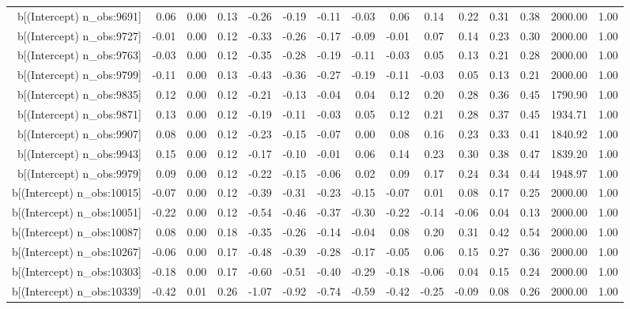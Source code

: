 \begin{table}[ht]
\begin{tabular}{rrrrrrrrrrrrrrr}
  b[(Intercept) n\_obs:9691] & 0.06 & 0.00 & 0.13 & -0.26 & -0.19 & -0.11 & -0.03 & 0.06 & 0.14 & 0.22 & 0.31 & 0.38 & 2000.00 & 1.00 \\ 
  b[(Intercept) n\_obs:9727] & -0.01 & 0.00 & 0.12 & -0.33 & -0.26 & -0.17 & -0.09 & -0.01 & 0.07 & 0.14 & 0.23 & 0.30 & 2000.00 & 1.00 \\ 
  b[(Intercept) n\_obs:9763] & -0.03 & 0.00 & 0.12 & -0.35 & -0.28 & -0.19 & -0.11 & -0.03 & 0.05 & 0.13 & 0.21 & 0.28 & 2000.00 & 1.00 \\ 
  b[(Intercept) n\_obs:9799] & -0.11 & 0.00 & 0.13 & -0.43 & -0.36 & -0.27 & -0.19 & -0.11 & -0.03 & 0.05 & 0.13 & 0.21 & 2000.00 & 1.00 \\ 
  b[(Intercept) n\_obs:9835] & 0.12 & 0.00 & 0.12 & -0.21 & -0.13 & -0.04 & 0.04 & 0.12 & 0.20 & 0.28 & 0.36 & 0.45 & 1790.90 & 1.00 \\ 
  b[(Intercept) n\_obs:9871] & 0.13 & 0.00 & 0.12 & -0.19 & -0.11 & -0.03 & 0.05 & 0.12 & 0.21 & 0.28 & 0.37 & 0.45 & 1934.71 & 1.00 \\ 
  b[(Intercept) n\_obs:9907] & 0.08 & 0.00 & 0.12 & -0.23 & -0.15 & -0.07 & 0.00 & 0.08 & 0.16 & 0.23 & 0.33 & 0.41 & 1840.92 & 1.00 \\ 
  b[(Intercept) n\_obs:9943] & 0.15 & 0.00 & 0.12 & -0.17 & -0.10 & -0.01 & 0.06 & 0.14 & 0.23 & 0.30 & 0.38 & 0.47 & 1839.20 & 1.00 \\ 
  b[(Intercept) n\_obs:9979] & 0.09 & 0.00 & 0.12 & -0.22 & -0.15 & -0.06 & 0.02 & 0.09 & 0.17 & 0.24 & 0.34 & 0.44 & 1948.97 & 1.00 \\ 
  b[(Intercept) n\_obs:10015] & -0.07 & 0.00 & 0.12 & -0.39 & -0.31 & -0.23 & -0.15 & -0.07 & 0.01 & 0.08 & 0.17 & 0.25 & 2000.00 & 1.00 \\ 
  b[(Intercept) n\_obs:10051] & -0.22 & 0.00 & 0.12 & -0.54 & -0.46 & -0.37 & -0.30 & -0.22 & -0.14 & -0.06 & 0.04 & 0.13 & 2000.00 & 1.00 \\ 
  b[(Intercept) n\_obs:10087] & 0.08 & 0.00 & 0.18 & -0.35 & -0.26 & -0.14 & -0.04 & 0.08 & 0.20 & 0.31 & 0.42 & 0.54 & 2000.00 & 1.00 \\ 
  b[(Intercept) n\_obs:10267] & -0.06 & 0.00 & 0.17 & -0.48 & -0.39 & -0.28 & -0.17 & -0.05 & 0.06 & 0.15 & 0.27 & 0.36 & 2000.00 & 1.00 \\ 
  b[(Intercept) n\_obs:10303] & -0.18 & 0.00 & 0.17 & -0.60 & -0.51 & -0.40 & -0.29 & -0.18 & -0.06 & 0.04 & 0.15 & 0.24 & 2000.00 & 1.00 \\ 
  b[(Intercept) n\_obs:10339] & -0.42 & 0.01 & 0.26 & -1.07 & -0.92 & -0.74 & -0.59 & -0.42 & -0.25 & -0.09 & 0.08 & 0.26 & 2000.00 & 1.00 \\ 

\end{tabular}
\end{table}

